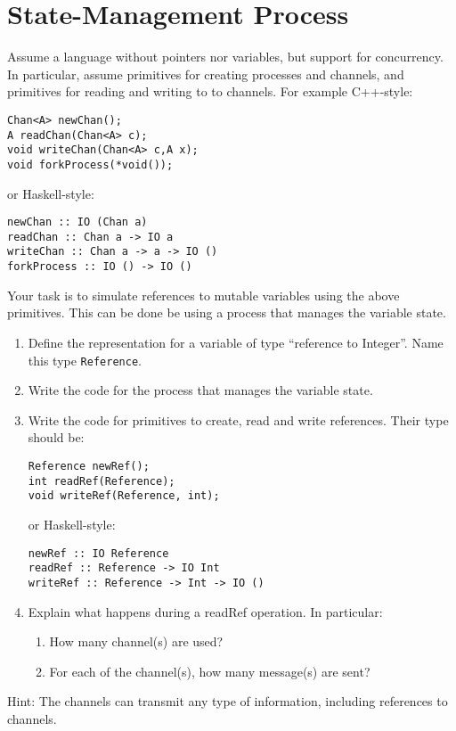 \documentclass{article}
\begin{document}
\section{State-Management Process}
Assume a language without pointers nor variables, but support for
concurrency. In particular, assume primitives for creating processes
and channels, and primitives for reading and writing to to
channels. For example C++-style:

\begin{verbatim}
Chan<A> newChan();
A readChan(Chan<A> c);
void writeChan(Chan<A> c,A x);
void forkProcess(*void());
\end{verbatim}
or Haskell-style:
\begin{verbatim}
newChan :: IO (Chan a)
readChan :: Chan a -> IO a
writeChan :: Chan a -> a -> IO ()
forkProcess :: IO () -> IO ()
\end{verbatim}

Your task is to simulate references to mutable variables using the
above primitives. This can be done be using a process that manages the
variable state.

\begin{enumerate}
\item Define the representation for a variable of type ``reference to
  Integer''. Name this type \texttt{Reference}. 
\item Write the code for the process that manages the variable state. 
\item Write the code for primitives to create, read and write references. 
Their type should be:
\begin{verbatim}
Reference newRef();
int readRef(Reference);
void writeRef(Reference, int);
\end{verbatim}
or Haskell-style:
\begin{verbatim}
newRef :: IO Reference
readRef :: Reference -> IO Int
writeRef :: Reference -> Int -> IO ()
\end{verbatim}
\item Explain what happens during a readRef operation. In particular:
  \begin{enumerate}
  \item How many channel(s) are used? 
  \item For each of the channel(s), how many message(s) are sent?  
  \end{enumerate}
\end{enumerate}

Hint: The channels can transmit any type of information, including
references to channels.
\end{document}

